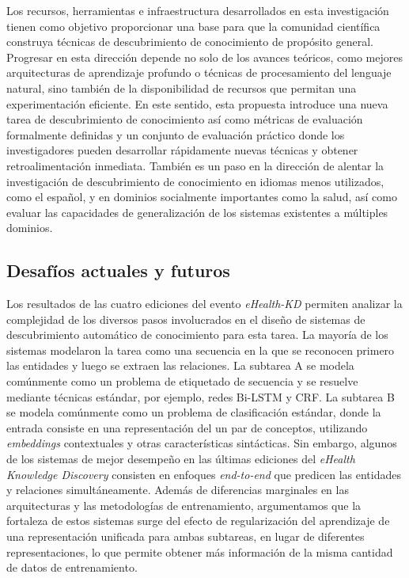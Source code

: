 Los recursos, herramientas e infraestructura desarrollados en esta investigación tienen como objetivo proporcionar una base para que la comunidad científica construya técnicas de descubrimiento de conocimiento de propósito general.
Progresar en esta dirección depende no solo de los avances teóricos, como mejores arquitecturas de aprendizaje profundo o técnicas de procesamiento del lenguaje natural, sino también de la disponibilidad de recursos que permitan una experimentación eficiente.
En este sentido, esta propuesta introduce una nueva tarea de descubrimiento de conocimiento así como métricas de evaluación formalmente definidas y un conjunto de evaluación práctico donde los investigadores pueden desarrollar rápidamente nuevas técnicas y obtener retroalimentación inmediata.
También es un paso en la dirección de alentar la investigación de descubrimiento de conocimiento en idiomas menos utilizados, como el español, y en dominios socialmente importantes como la salud, así como evaluar las capacidades de generalización de los sistemas existentes a múltiples dominios.

\subsection{Desafíos actuales y futuros}

Los resultados de las cuatro ediciones del evento \textit{eHealth-KD} permiten analizar la complejidad de los diversos pasos involucrados en el diseño de sistemas de descubrimiento automático de conocimiento para esta tarea.
La mayoría de los sistemas modelaron la tarea como una secuencia en la que se reconocen primero las entidades y luego se extraen las relaciones.
La subtarea A se modela comúnmente como un problema de etiquetado de secuencia y se resuelve mediante técnicas estándar, por ejemplo, redes Bi-LSTM y CRF.
La subtarea B se modela comúnmente como un problema de clasificación estándar, donde la entrada consiste en una representación del un par de conceptos, utilizando \textit{embeddings} contextuales y otras características sintácticas.
Sin embargo, algunos de los sistemas de mejor desempeño en las últimas ediciones del \textit{eHealth Knowledge Discovery} consisten en enfoques \textit{end-to-end} que predicen las entidades y relaciones simultáneamente.
Además de diferencias marginales en las arquitecturas y las metodologías de entrenamiento, argumentamos que la fortaleza de estos sistemas surge del efecto de regularización del aprendizaje de una representación unificada para ambas subtareas, en lugar de diferentes representaciones, lo que permite obtener más información de la misma cantidad de datos de entrenamiento.

